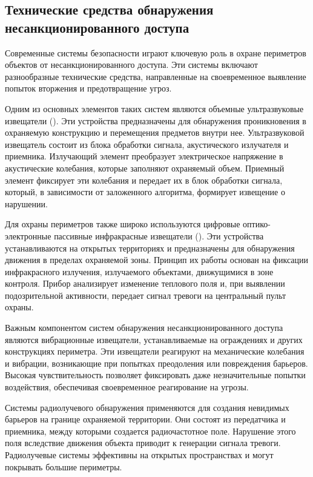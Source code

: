 \subsection{Технические средства обнаружения несанкционированного доступа}
Современные системы безопасности играют ключевую роль в охране периметров объектов от несанкционированного доступа. Эти системы включают разнообразные технические средства, направленные на своевременное выявление попыток вторжения и предотвращение угроз.

Одним из основных элементов таких систем являются объемные ультразвуковые извещатели (). Эти устройства предназначены для обнаружения проникновения в охраняемую конструкцию и перемещения предметов внутри нее. Ультразвуковой извещатель состоит из блока обработки сигнала, акустического излучателя и приемника. Излучающий элемент преобразует электрическое напряжение в акустические колебания, которые заполняют охраняемый объем. Приемный элемент фиксирует эти колебания и передает их в блок обработки сигнала, который, в зависимости от заложенного алгоритма, формирует извещение о нарушении.

Для охраны периметров также широко используются цифровые оптико-электронные пассивные инфракрасные извещатели (). Эти устройства устанавливаются на открытых территориях и предназначены для обнаружения движения в пределах охраняемой зоны. Принцип их работы основан на фиксации инфракрасного излучения, излучаемого объектами, движущимися в зоне контроля. Прибор анализирует изменение теплового поля и, при выявлении подозрительной активности, передает сигнал тревоги на центральный пульт охраны.

Важным компонентом систем обнаружения несанкционированного доступа являются вибрационные извещатели, устанавливаемые на ограждениях и других конструкциях периметра. Эти извещатели реагируют на механические колебания и вибрации, возникающие при попытках преодоления или повреждения барьеров. Высокая чувствительность позволяет фиксировать даже незначительные попытки воздействия, обеспечивая своевременное реагирование на угрозы.

Системы радиолучевого обнаружения применяются для создания невидимых барьеров на границе охраняемой территории. Они состоят из передатчика и приемника, между которыми создается радиочастотное поле. Нарушение этого поля вследствие движения объекта приводит к генерации сигнала тревоги. Радиолучевые системы эффективны на открытых пространствах и могут покрывать большие периметры.

